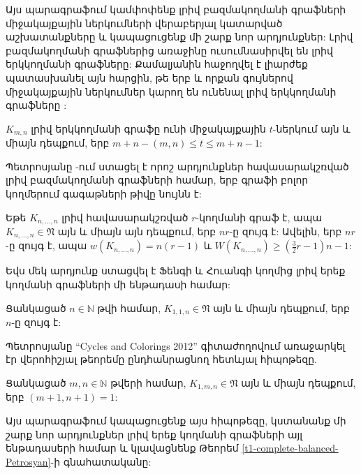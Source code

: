Այս պարագրաֆում կամփոփենք լրիվ բազմակողմանի գրաֆների միջակայքային ներկումների վերաբերյալ կատարված աշխատանքները և կապացուցենք մի շարք նոր արդյունքներ: Լրիվ բազմակողմանի գրաֆներից առաջինը ուսումնասիրվել են լրիվ երկկողմանի գրաֆները: Քամալյանին հաջողվել է լիարժեք պատասխանել այն հարցին, թե երբ և որքան գույներով միջակայքային ներկումներ կարող են ունենալ լրիվ երկկողմանի գրաֆները \cite{Kamalian1989}:

\begin{theorem}
\label{t1_complete_bipartite}
$K_{m,n}$ լրիվ երկկողմանի գրաֆը ունի միջակայքային $t$-ներկում այն և միայն դեպքում, երբ $m+n-(m,n) \leq t \leq m+n-1$:
\end{theorem}

Պետրոսյանը \cite{Petrosyan2012}-ում ստացել է որոշ արդյունքներ հավասարակշռված լրիվ բազմակողմանի գրաֆների համար, երբ գրաֆի բոլոր կողմերում գագաթների թիվը նույնն է:
\begin{theorem}
\label{t1-complete-balanced-Petrosyan}
Եթե $K_{n,\ldots,n}$ լրիվ հավասարակշռված $r$-կողմանի գրաֆ է, ապա
$K_{n,\ldots,n} \in \mathfrak{N}$ այն և միայն այն դեպքում, երբ $nr$-ը զույգ է: Ավելին, երբ $nr$-ը զույգ է, ապա $w(K_{n,\ldots,n}) = n(r-1)$ և $W(K_{n,\ldots,n}) \geq \left(
\frac{3}{2}r-1 \right)n-1$:
\end{theorem}

Եվս մեկ արդյունք ստացվել է Ֆենգի և Հուանգի կողմից \cite{FengHuang2007} լրիվ երեք կողմանի գրաֆների մի ենթադասի համար:
\begin{theorem}
\label{FengHuang}
Ցանկացած $n\in\mathbb{N}$ թվի համար, $K_{1,1,n}\in \mathfrak{N}$ այն և միայն դեպքում, երբ $n$-ը զույգ է:
\end{theorem}

Պետրոսյանը ``Cycles and Colorings 2012'' գիտաժողովում առաջարկել էր վերոհիշյալ թեորեմը ընդհանրացնող հետևյալ հիպոթեզը.
\begin{hypothesis}
Ցանկացած $m,n\in\mathbb{N}$ թվերի համար, $K_{1,m,n}\in\mathfrak{N}$ այն և միայն դեպքում, երբ
$(m+1,n+1)=1$:
\end{hypothesis}

Այս պարագրաֆում կապացուցենք այս հիպոթեզը, կստանանք մի շարք նոր արդյունքներ լրիվ երեք կողմանի գրաֆների այլ ենթադասերի համար և կլավացնենք Թեորեմ \ref{t1-complete-balanced-Petrosyan}-ի գնահատականը:

